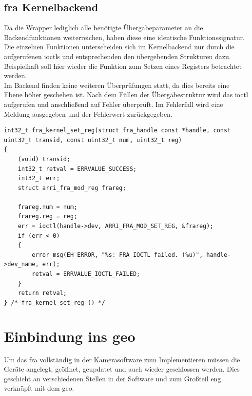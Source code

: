 \subsection{\acs{fra} Kernelbackend}
Da die Wrapper lediglich alle benötigte Übergabeparameter an die Backendfunktionen weiterreichen, haben diese eine identische Funktionssignatur. 
Die einzelnen Funktionen unterscheiden sich im Kernelbackend nur durch die aufgerufenen \ac{ioctl}s und entsprechenden den übergebenden Strukturen dazu. Beispielhaft soll hier wieder die Funktion zum Setzen eines Registers betrachtet werden. \\


Im Backend finden keine weiteren Überprüfungen statt, da dies bereits eine Ebene höher geschehen ist. Nach dem Füllen der Übergabestruktur wird das \ac{ioctl} aufgerufen und anschließend auf Fehler überprüft. 
Im Fehlerfall wird eine Meldung ausgegeben und der Fehlerwert zurückgegeben. 

\begin{lstfloat}
\begin{lstlisting}
int32_t fra_kernel_set_reg(struct fra_handle const *handle, const uint32_t transid, const uint32_t num, uint32_t reg)
{
	(void) transid;
	int32_t retval = ERRVALUE_SUCCESS;
	int32_t err;
	struct arri_fra_mod_reg frareg;
	
	frareg.num = num;
	frareg.reg = reg;
	err = ioctl(handle->dev, ARRI_FRA_MOD_SET_REG, &frareg);
	if (err < 0)
	{
		error_msg(EH_ERROR, "%s: FRA IOCTL failed. (%u)", handle->dev_name, err);
		retval = ERRVALUE_IOCTL_FAILED;
	}  
	return retval;
} /* fra_kernel_set_reg () */
\end{lstlisting}
\end{lstfloat}

\section{Einbindung ins \acl{geo}}\label{sec:soft}
Um das \ac{fra} vollständig in der Kamerasoftware zum Implementieren müssen die Geräte angelegt, geöffnet, geupdatet und auch wieder geschlossen werden. Dies geschieht an verschiedenen Stellen in der Software und zum Großteil eng verknüpft mit dem \ac{geo}.\\


